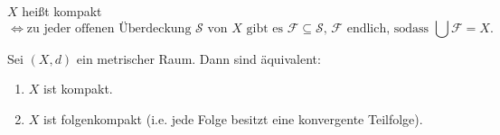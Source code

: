 \documentclass[]{scrartcl}
\begin{document}
\begin{definition}[Kompaktheit]
$X$ hei\ss t kompakt
\[\Leftrightarrow\text{zu jeder offenen \"Uberdeckung $\mathcal{S}$ von $X$ gibt es $\mathcal{F}\subseteq\mathcal{S}$, $\mathcal{F}$ endlich, sodass $\bigcup\mathcal{F}=X$.}\]
\end{definition}

\begin{satz}
Sei $(X,d)$ ein metrischer Raum. Dann sind \"aquivalent:
\begin{enumerate}
\item $X$ ist kompakt.
\item $X$ ist folgenkompakt (i.e. jede Folge besitzt eine konvergente Teilfolge). 
\end{enumerate}
\end{satz}
\end{document}
